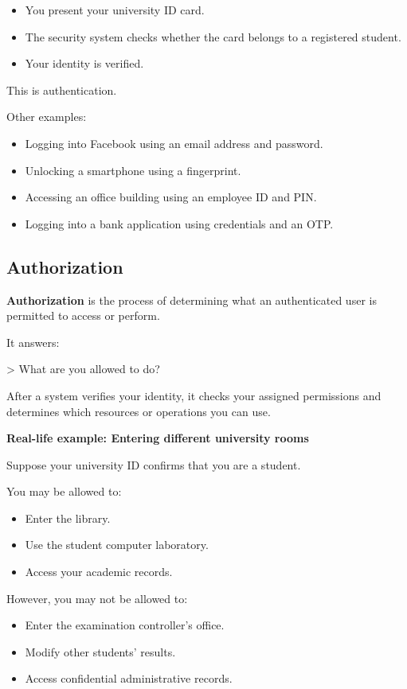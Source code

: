 \begin{itemize}
\item You present your university ID card.
\item The security system checks whether the card belongs to a registered student.
\item Your identity is verified.
\end{itemize}

This is authentication.

Other examples:

\begin{itemize}
\item Logging into Facebook using an email address and password.
\item Unlocking a smartphone using a fingerprint.
\item Accessing an office building using an employee ID and PIN.
\item Logging into a bank application using credentials and an OTP.
\end{itemize}

\subsection{Authorization}

\textbf{Authorization} is the process of determining what an authenticated user is permitted to access or perform.

It answers:

> What are you allowed to do?

After a system verifies your identity, it checks your assigned permissions and determines which resources or operations you can use.

\textbf{Real-life example: Entering different university rooms}

Suppose your university ID confirms that you are a student.

You may be allowed to:

\begin{itemize}
\item Enter the library.
\item Use the student computer laboratory.
\item Access your academic records.
\end{itemize}

However, you may not be allowed to:

\begin{itemize}
\item Enter the examination controller's office.
\item Modify other students' results.
\item Access confidential administrative records.
\end{itemize}

